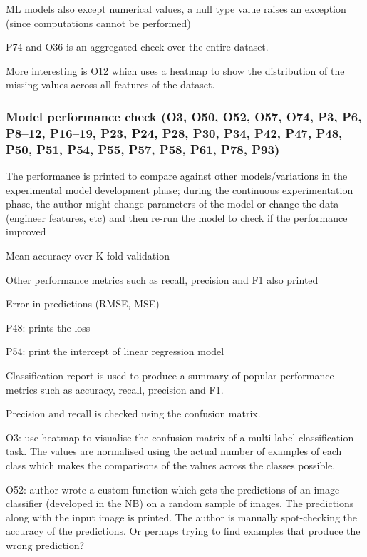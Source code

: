 ML models also except numerical values, a null type value raises an exception (since computations cannot be performed)

P74 and O36 is an aggregated check over the entire dataset.

More interesting is O12 which uses a heatmap to show the distribution of the missing values across all features of the dataset.

\subsubsection{Model performance check (O3, O50, O52, O57, O74, P3, P6, P8--12, P16--19, P23, P24, P28, P30, P34, P42, P47, P48, P50, P51, P54, P55, P57, P58, P61, P78, P93)}

The performance is printed to compare against other models/variations in the experimental model development phase; during the continuous experimentation phase, the author might change parameters of the model or change the data (engineer features, etc) and then re-run the model to check if the performance improved

Mean accuracy over K-fold validation

Other performance metrics such as recall, precision and F1 also printed

Error in predictions (RMSE, MSE)

P48: prints the loss

P54: print the intercept of linear regression model

Classification report is used to produce a summary of popular performance metrics such as accuracy, recall, precision and F1.

Precision and recall is checked using the confusion matrix.

O3: use heatmap to visualise the confusion matrix of a multi-label classification task. The values are normalised using the actual number of examples of each class which makes the comparisons of the values across the classes possible.

O52: author wrote a custom function which gets the predictions of an image classifier (developed in the NB) on a random sample of images. The predictions along with the input image is printed. The author is manually spot-checking the accuracy of the predictions. Or perhaps trying to find examples that produce the wrong prediction?

